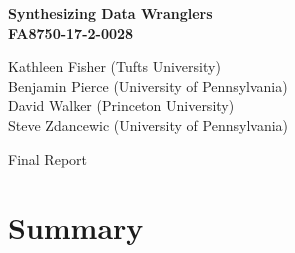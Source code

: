 \documentclass[12pt]{article}
\begin{document}
\pagestyle{empty}

\begin{center}

  \vspace{1in}

  \Large \textbf{Synthesizing Data Wranglers\\\vspace{1cm} FA8750-17-2-0028}

  \vspace{1in}

  \large
  Kathleen Fisher (Tufts University) \\
  Benjamin Pierce  (University of Pennsylvania) \\
  David Walker (Princeton University) \\
  Steve Zdancewic (University of Pennsylvania)
  \vspace{1in}

  Final Report

\end{center}

\newpage
\pagestyle{plain}

\renewcommand{\thepage}{\roman{page}}%
\setcounter{page}{1}%

\tableofcontents
\newpage

\listoffigures
\newpage

\renewcommand{\thepage}{\arabic{page}}%
\setcounter{page}{1}%

\section{Summary}
\end{document}
